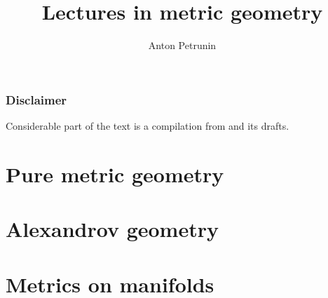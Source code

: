 \documentclass[twoside]{book}
\begin{document}
 
\title{Lectures in metric geometry}
\author{Anton Petrunin}
\date{}
\maketitle



\section*{Disclaimer}

Considerable part of the text is a compilation from \cite{alexander-kapovitch-petrunin-2019, alexander-kapovitch-petrunin-2025, petrunin-yashinski, petrunin-2009, petrunin-zamorabarrera} and its drafts.

\thispagestyle{empty}
\tableofcontents
\thispagestyle{empty}


\part{Pure metric geometry}





\part{Alexandrov geometry}






\part{Metrics on manifolds}


%
\appendix


%
{
\printbibliography[heading=bibintoc]
\fussy
}
\end{document}
